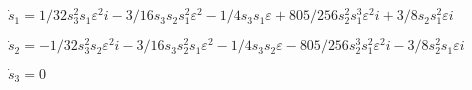 \documentclass[11pt,a5paper]{article}
\def\eps{\varepsilon}
\begin{document}
\(\dot s_{1}=1/32 s_{3}^{2} s_{1} \eps^{2} i-3/16 s_{3} s_{2} s_{1}^{2} 
\eps^{2}-1/4 s_{3} s_{1} \eps+805/256 s_{2}^{2} s_{1}^{3} \eps^{2} i+3/8
 s_{2} s_{1}^{2} \eps i
\)\par

\(\dot s_{2}=-1/32 s_{3}^{2} s_{2} \eps^{2} i-3/16 s_{3} s_{2}^{2} s_{1} 
\eps^{2}-1/4 s_{3} s_{2} \eps-805/256 s_{2}^{3} s_{1}^{2} \eps^{2} i-3/8
 s_{2}^{2} s_{1} \eps i
\)\par

\(\dot s_{3}=0
\)\par
\end{document}
